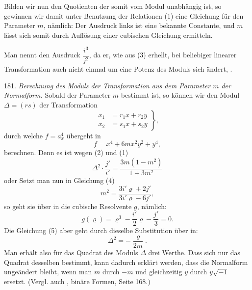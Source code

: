 Bilden wir nun den Quotienten
der somit vom Modul unabh\"angig ist, so gewinnen wir damit unter Benutzung der Relationen (1) eine Gleichung f\"ur den Parameter $m$, n\"amlich:
Der Ausdruck links ist eine bekannte Constante, und $m$ l\"asst sich somit durch Aufl\"osung einer cubischen Gleichung ermitteln.

Man nennt den Ausdruck $\dfrac{i^3}{j^2}$, da er, wie aus (3) erhellt, bei beliebiger linearer Transformation auch nicht einmal um eine Potenz des Moduls sich \"andert, .

181. \textit{Berechnung des Moduls der Transformation aus dem Parameter $m$ der Normalform.} Sobald der Parameter $m$ bestimmt ist, so k\"onnen wir den Modul $\Delta=(rs)$ der Transformation
\[
\left.\begin{aligned}
x_1 &= r_1 x + r_2 y\\
x_2 &= s_1 x + s_2 y
\end{aligned}\right\},
\]
durch welche $f=a_x^4$ \"ubergeht in
\[
f = x^4 + 6mx^2y^2 + y^4,
\]
berechnen. Denn es ist wegen (2) und (1)
\[
\Delta^2\cdot\frac{j'}{i'} = \frac{3m(1-m^2)}{1+3m^2}
\]
oder
Setzt man nun in Gleichung (4)
\[
m^2 = \frac{3i'\varrho+2j'}{3i'\varrho-6j'},
\]
so geht sie \"uber in die cubische Resolvente $g$, n\"amlich:
\[
g(\varrho) = \varrho^3 - \frac{i'}{2}\varrho - \frac{j'}{3} = 0.
\]
Die Gleichung (5) aber geht durch dieselbe Substitution \"uber in:
\[
\Delta^2 = -\frac{\varrho}{2m}.
\]
Man erh\"alt also f\"ur das Quadrat des Moduls $\Delta$ drei Werthe. Dass sich nur das Quadrat desselben bestimmt, kann dadurch erkl\"art werden, dass die Normalform unge\"andert bleibt, wenn man $m$ durch $-m$ und gleichzeitig $y$ durch $y\sqrt{-1}$ ersetzt. (Vergl. auch , bin\"are Formen, Seite 168.)


